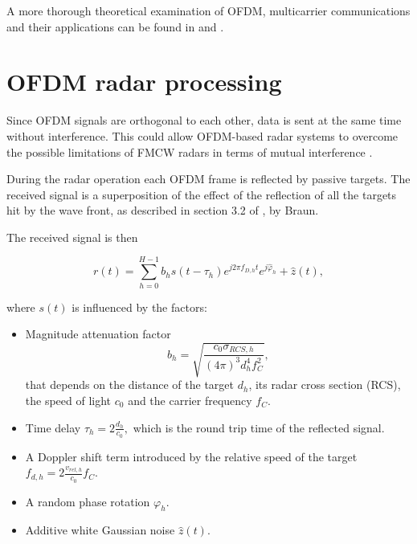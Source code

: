 A more thorough theoretical examination of OFDM, multicarrier communications and their applications can be found in \cite{OFDMWireless} and \cite{Proakis_2001}.


\section{OFDM radar processing}
    
    Since OFDM signals are orthogonal to each other, data is sent at the same time without interference. This could allow OFDM-based radar systems to overcome the possible limitations of FMCW radars in terms of mutual interference \cite{Goppelt_Blöcher_Menzel_2010}.
    
    During the radar operation each OFDM frame is reflected by passive targets. The received signal is a superposition of the effect of the reflection of all the targets hit by the wave front, as described in section 3.2 of \cite{Braun2014OFDMRA}, by Braun.
    
    The received signal is then
    
    \begin{equation}
    \label{eq:received_signal_mltiple_targets}
        r(t) = \sum_{h=0}^{H-1} b_h s(t-\tau_h)e^{j2\pi f_{D,h}t}e^{j\hat{\varphi}_h} + \hat{z}(t),
    \end{equation}
    
    where $s(t)$ is influenced by the factors:
    
    \begin{itemize}
        \item Magnitude attenuation factor $$b_h = \sqrt{\frac{c_0\sigma_{RCS,h}}{(4\pi)^3 d_h^4f_C^2}},$$
    that depends on the distance of the target $d_h$, its radar cross section (RCS), the speed of light $c_0$ and the carrier frequency $f_C$.
    
        \item Time delay $\tau_h = 2\frac{d_h}{c_0},$ which is the round trip time of the reflected signal.
    
        \item A Doppler shift term introduced by the relative speed of the target $f_{d,h} = 2 \frac{v_{rel,h}}{c_0}f_C$.
        \item A random phase rotation $\varphi_h$.
        \item Additive white Gaussian noise $\hat{z}(t)$.
    \end{itemize}
    
